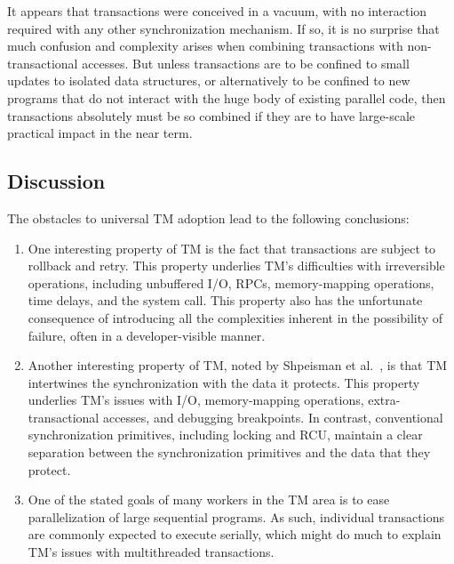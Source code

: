 It appears that transactions were conceived in a vacuum, with no
interaction required with any other synchronization mechanism.
If so, it is no surprise that much confusion and complexity arises when
combining transactions with non-transactional accesses.
But unless transactions are to be confined to small updates to isolated
data structures, or alternatively to be confined to new programs
that do not interact with the huge body of existing parallel code,
then transactions absolutely must be so combined if they are to have
large-scale practical impact in the near term.


\subsection{Discussion}
\label{sec:future:Discussion}

The obstacles to universal TM adoption lead to the following
conclusions:

\begin{enumerate}
\item	One interesting property of TM is the fact that transactions are
	subject to rollback and retry.
	This property underlies TM's difficulties with irreversible
	operations, including unbuffered I/O, RPCs, memory-mapping
	operations, time delays, and the  system call.
	This property also has the unfortunate consequence of introducing
	all the complexities inherent in the possibility of failure,
	often in a developer-visible manner.
\item	Another interesting property of TM, noted by
	Shpeisman et al.~\cite{TatianaShpeisman2009CppTM}, is that TM
	intertwines the synchronization with the data it protects.
	This property underlies TM's issues with I/O, memory-mapping
	operations, extra-transactional accesses, and debugging
	breakpoints.
	In contrast, conventional synchronization primitives, including
	locking and RCU, maintain a clear separation between the
	synchronization primitives and the data that they protect.
\item	One of the stated goals of many workers in the TM area is to
	ease parallelization of large sequential programs.
	As such, individual transactions are commonly expected to
	execute serially, which might do much to explain TM's issues
	with multithreaded transactions.
\end{enumerate}

\QuickQuizEnd

